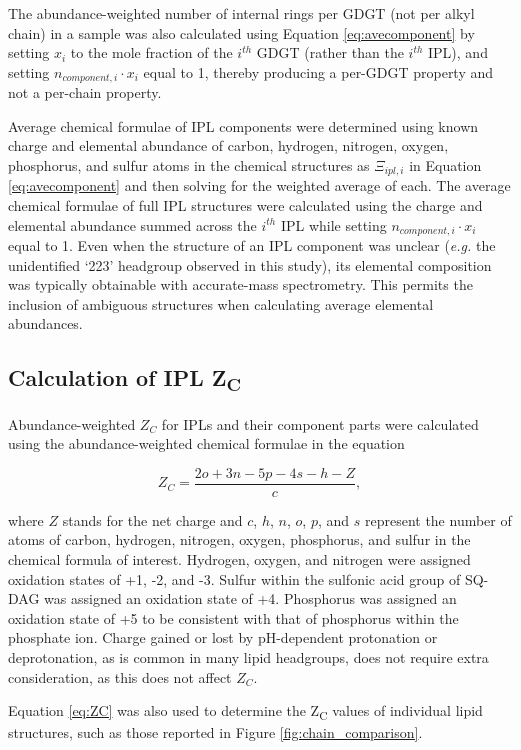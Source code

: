 The abundance-weighted number of internal rings per GDGT (not per alkyl chain) in a sample was also calculated using Equation \ref{eq:avecomponent} by setting $x_{i}$ to the mole fraction of the $i^{th}$ GDGT (rather than the $i^{th}$ IPL), and setting $n_{component,i} \cdot x_{i}$ equal to 1, thereby producing a per-GDGT property and not a per-chain property.

Average chemical formulae of IPL components were determined using known charge and elemental abundance of carbon, hydrogen, nitrogen, oxygen, phosphorus, and sulfur atoms in the chemical structures as $\Xi_{ipl,i}$ in Equation \ref{eq:avecomponent} and then solving for the weighted average of each. The average chemical formulae of full IPL structures were calculated using the charge and elemental abundance summed across the $i^{th}$ IPL while setting $n_{component,i} \cdot x_{i}$ equal to 1. Even when the structure of an IPL component was unclear (\textit{e.g.} the unidentified `223' headgroup observed in this study), its elemental composition was typically obtainable with accurate-mass spectrometry. This permits the inclusion of ambiguous structures when calculating average elemental abundances.

\subsection{Calculation of IPL Z\textsubscript{C}}
Abundance-weighted $Z_{C}$ for IPLs and their component parts were calculated using the abundance-weighted chemical formulae in the equation

\begin{equation} \label{eq:ZC}
{Z}_{C} = \frac{2o + 3n - 5p - 4s - h - Z}{c},
\end{equation}

\noindent where $Z$ stands for the net charge and $c$, $h$, $n$, $o$, $p$, and $s$ represent the number of atoms of carbon, hydrogen, nitrogen, oxygen, phosphorus, and sulfur in the chemical formula of interest. Hydrogen, oxygen, and nitrogen were assigned oxidation states of +1, -2, and -3. Sulfur within the sulfonic acid group of SQ-DAG was assigned an oxidation state of +4. Phosphorus was assigned an oxidation state of +5 to be consistent with that of phosphorus within the phosphate ion. Charge gained or lost by pH-dependent protonation or deprotonation, as is common in many lipid headgroups, does not require extra consideration, as this does not affect $Z_{C}$.

Equation \ref{eq:ZC} was also used to determine the Z\textsubscript{C} values of individual lipid structures, such as those reported in Figure \ref{fig:chain_comparison}.

